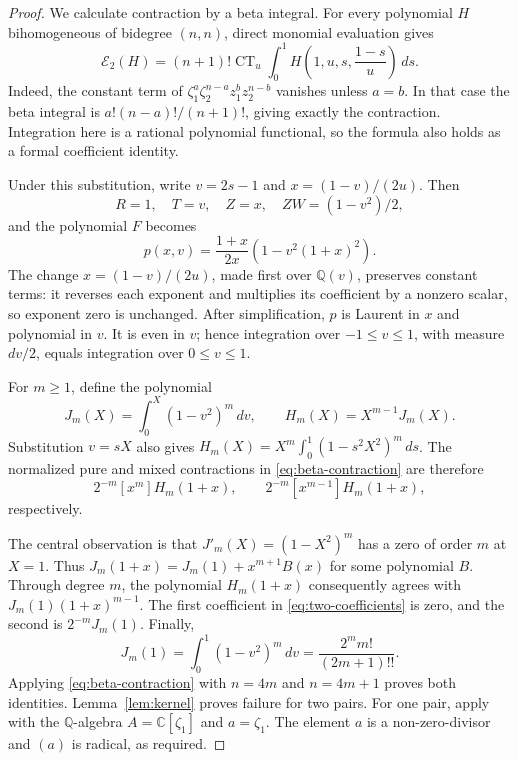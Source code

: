 \documentclass[11pt]{article}
\newcommand{\Eop}{\mathcal E}
\begin{document}
\begin{proof}
We calculate contraction by a beta integral. For every polynomial \(H\)
bihomogeneous of bidegree \((n,n)\), direct monomial evaluation gives
\begin{equation}\label{eq:beta-contraction}
 \Eop_2(H)=(n+1)!\operatorname{CT}_u
  \int_0^1H\left(1,u,s,\frac{1-s}{u}\right)\,ds.
\end{equation}
Indeed, the constant term of
\(\zeta_1^a\zeta_2^{n-a}z_1^bz_2^{n-b}\) vanishes unless \(a=b\).
In that case the beta integral is
\(a!(n-a)!/(n+1)!\), giving exactly the contraction.
Integration here is a rational polynomial functional, so the formula
also holds as a formal coefficient identity.

Under this substitution, write \(v=2s-1\) and
\(x=(1-v)/(2u)\). Then
\[
 R=1,\quad T=v,\quad Z=x,\quad ZW=(1-v^2)/2,
\]
and the polynomial \(F\) becomes
\[
 p(x,v)=\frac{1+x}{2x}\left(1-v^2(1+x)^2\right).
\]
The change \(x=(1-v)/(2u)\), made first over \(\mathbb Q(v)\),
preserves constant terms: it reverses each exponent and multiplies its
coefficient by a nonzero scalar, so exponent zero is unchanged. After
simplification, \(p\) is Laurent in \(x\) and polynomial in \(v\).
It is even in \(v\); hence integration over \(-1\leq v\leq1\), with
measure \(dv/2\), equals integration over \(0\leq v\leq1\).

For \(m\geq1\), define the polynomial
\[
 J_m(X)=\int_0^X(1-v^2)^m\,dv,\qquad
 H_m(X)=X^{m-1}J_m(X).
\]
Substitution \(v=sX\) also gives
\(H_m(X)=X^m\int_0^1(1-s^2X^2)^m\,ds\).
The normalized pure and mixed contractions in
\eqref{eq:beta-contraction} are therefore
\begin{equation}\label{eq:two-coefficients}
 2^{-m}[x^m]H_m(1+x),\qquad
 2^{-m}[x^{m-1}]H_m(1+x),
\end{equation}
respectively.

The central observation is that \(J'_m(X)=(1-X^2)^m\) has a zero
of order \(m\) at \(X=1\). Thus
\(J_m(1+x)=J_m(1)+x^{m+1}B(x)\) for some polynomial \(B\).
Through degree \(m\), the polynomial \(H_m(1+x)\) consequently
agrees with \(J_m(1)(1+x)^{m-1}\). The first coefficient in
\eqref{eq:two-coefficients} is zero, and the second is
\(2^{-m}J_m(1)\). Finally,
\[
 J_m(1)=\int_0^1(1-v^2)^m\,dv
       =\frac{2^m m!}{(2m+1)!!}.
\]
Applying \eqref{eq:beta-contraction} with \(n=4m\) and \(n=4m+1\)
proves both identities. Lemma~\ref{lem:kernel} proves failure for two
pairs. For one pair, apply~\cite[Theorem 2.8]{EWZ2011} with the
\(\mathbb Q\)-algebra \(A=\mathbb C[\zeta_1]\) and
\(a=\zeta_1\). The element \(a\) is a non-zero-divisor and
\((a)\) is radical, as required.
\end{proof}
\end{document}
